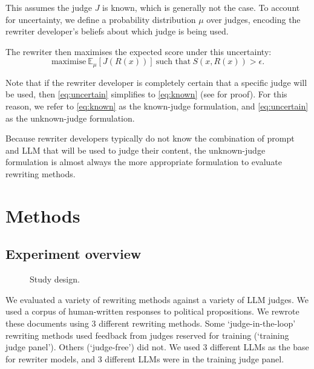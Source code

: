 \documentclass{article}
\begin{document}
This assumes the judge $J$ is known, which is generally not the case. To account for uncertainty, we define a probability distribution $\mu$ over judges, encoding the rewriter developer's beliefs about which judge is being used.

The rewriter then maximises the expected score under this uncertainty:
\begin{equation}\label{eq:uncertain}
\text{maximise} \ \mathbb{E}_\mu[J(R(x))] \ \text{such that} \ S(x,R(x)) > \epsilon.
\end{equation}

Note that if the rewriter developer is completely certain that a specific judge will be used, then \cref{eq:uncertain} simplifies to \cref{eq:known} (see  for proof). For this reason, we refer to \cref{eq:known} as the known-judge formulation, and \cref{eq:uncertain} as the unknown-judge formulation. 

Because rewriter developers typically do not know the combination of prompt and LLM that will be used to judge their content, the unknown-judge formulation is almost always the more appropriate formulation to evaluate rewriting methods.


\section{Methods}

\subsection{Experiment overview}

\begin{figure}[h]
  \centering
  \resizebox{\linewidth}{!}{}
  \caption{Study design.}
  \label{fig:study-design}
\end{figure}

We evaluated a variety of rewriting methods against a variety of LLM judges. We used a corpus of human-written responses to political propositions. We rewrote these documents using 3 different rewriting methods. Some `judge-in-the-loop' rewriting methods used feedback from judges reserved for training (`training judge panel'). Others (`judge-free') did not. We used 3 different LLMs as the base for rewriter models, and 3 different LLMs were in the training judge panel.
\end{document}
